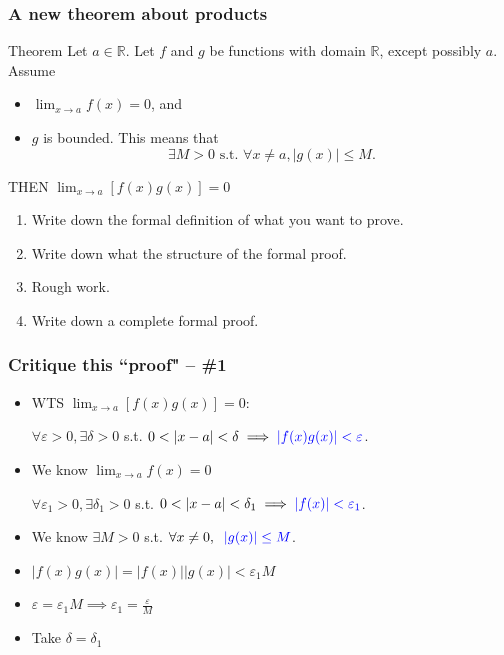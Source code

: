 \documentclass[14pt]{beamer}
\newcommand {\DS} [1] {${\displaystyle #1}$}
\newcommand {\R}{\mathbb{R}}
\newcommand{\e}{\varepsilon}
\newcommand{\p}{\pause}
\newcommand{\azul}[1]{{\color{blue} #1}}
\newcommand{\setsize}[1]{\fontsize{#1}{#1}\selectfont} %
\newcommand{\smallerfont}{\setsize{13}} %
\begin{document}
\begin{frame}[t]
\frametitle{A new theorem about products}
\smallerfont
\begin{block}{Theorem}
Let $a \in \R$.  Let $f$ and $g$ be functions with domain $\R$, except possibly $a$. 
 Assume
	\begin{itemize}
		\item  \DS{\lim_{x \to a} f(x) = 0}, and
		\item $g$ is bounded. 
			This means that 
			$$\exists M >0 \mbox{ s.t. } \forall x \neq a, |g(x)| \leq M.$$
	\end{itemize}
THEN  \DS{\lim_{x \to a} \left[ f(x) g(x) \right] = 0}
\end{block}

 \vfill 
\begin{enumerate}
\p	\item  Write down the formal definition of what you want to prove.
\p	\item  Write down what the structure of the formal proof.
\p 	\item  Rough work.
\p	\item  Write down a complete formal proof.
\end{enumerate}
\vfill

\end{frame}
\begin{frame}[t]
\frametitle{Critique this ``proof" -- \#1}
\smallerfont
\begin{itemize}
	\item  WTS \DS{\lim_{x \to a} \left[ f(x) g(x) \right] = 0}:
	
		\hfill \DS{\forall \e>0, \exists \delta>0} \; s.t. \; \DS{0<|x-a|<\delta \implies \azul{|f(x) g(x)| < \e}}. 
\vfill	
	\item  We know \DS{\lim_{x \to a} f(x) = 0}
	
		\hfill \DS{\forall \e_1>0, \exists \delta_1 >0 } \; s.t. \; \DS{0<|x-a|<\delta_1 \implies \azul{|f(x)| <\e_1}}.
\vfill
	\item   We know \hfill \DS{\exists M>0} \; s.t. \; \DS{\forall x \neq 0, \; \; \azul{|g(x)| \leq M}}.
\vfill
	\item  \DS{|f(x)g(x)| = |f(x)||g(x)| < \e_1 M}
\vfill
	\item \DS{\e = \e_1 M \implies \e_1 = \frac{\e}{M}}
\vfill
	\item Take  \DS{\delta = \delta_1}
\vfill
\end{itemize}
\end{frame}
\end{document}
